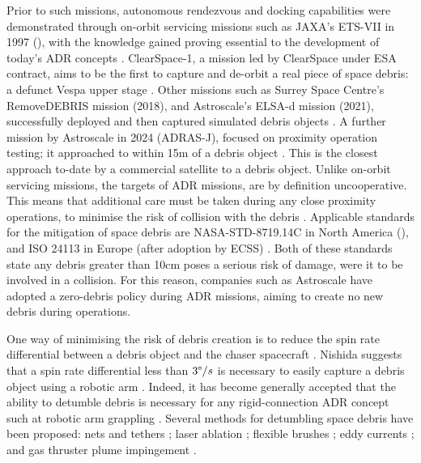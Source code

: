 \documentclass[journal]{new-aiaa}
\begin{document}
Prior to such missions, autonomous rendezvous and docking capabilities were demonstrated through on-orbit servicing missions such as JAXA's ETS-VII in 1997 (\cite{mokunoInorbitDemonstrationRendezvous2004}), with the knowledge gained proving essential to the development of today's ADR concepts \cite{jaekelDesignOperationalElements2018}. ClearSpace-1, a mission led by ClearSpace under ESA contract, aims to be the first to capture and de-orbit a real piece of space debris: a defunct Vespa upper stage \cite{ClearSpace12025}. Other missions such as Surrey Space Centre's RemoveDEBRIS mission (2018), and Astroscale's ELSA-d mission (2021), successfully deployed and then captured simulated debris objects \cite{forshawRemoveDEBRISInorbitActive2016,ELSAdAstroscaleSecuring2025}. A further mission by Astroscale in 2024 (ADRAS-J), focused on proximity operation testing; it approached to within 15m of a debris object  \cite{ADRASJAstroscaleSecuring2025}. This is the closest approach to-date by a commercial satellite to a debris object. Unlike on-orbit servicing missions, the targets of ADR missions, are by definition uncooperative. This means that additional care must be taken during any close proximity operations, to minimise the risk of collision with the debris \cite{shanReviewComparisonActive2016}. Applicable standards for the mitigation of space debris are NASA-STD-8719.14C in North America (\cite{nationalaeronauticcsandspaceadministrationNASASTD871914C2021}), and ISO 24113 in Europe (after adoption by ECSS) \cite{ecssspacedebrisworkinggroupAdoptionNoticeISO09}. Both of these standards state any debris greater than 10cm poses a serious risk of damage, were it to be involved in a collision. For this reason, companies such as Astroscale have adopted a zero-debris policy during ADR missions, aiming to create no new debris during operations.

One way of minimising the risk of debris creation is to reduce the spin rate differential between a debris object and the chaser spacecraft \cite{bonnalActiveDebrisRemoval2013}. Nishida suggests that a spin rate differential less than $3\degree /s$ is necessary to easily capture a debris object using a robotic arm \cite{nishidaStrategyCapturingTumbling2011}. Indeed, it has become generally accepted that the ability to detumble debris is necessary for any rigid-connection ADR concept such at robotic arm grappling \cite{ledkovReviewContactContactless2022a}. Several methods for detumbling space debris have been proposed: nets and tethers \cite{oconnorDetumblingSpaceDebris2017}; laser ablation \cite{vetrisanoDetumblingLargeSpace2015}; flexible brushes \cite{chengStrategyControlRobotic2019}; eddy currents \cite{ortizgomezEddyCurrentsApplied2015}; and gas thruster plume impingement \cite{ferrariGasPlumeImpingement2014,nakajimaDetumblingSpaceDebris2016,petersCOBRAContactlessDetumbling2016}.
    
\end{document}
